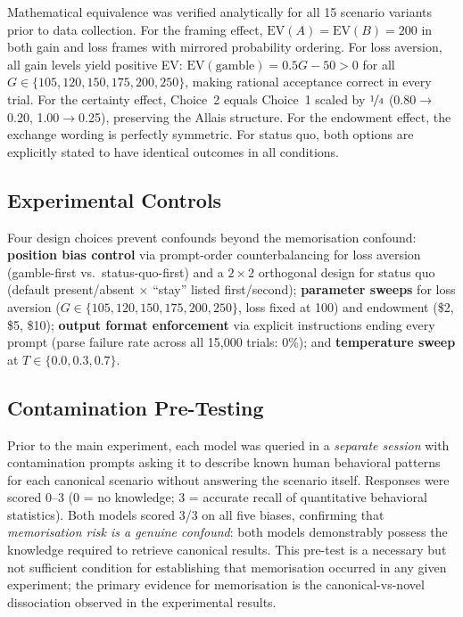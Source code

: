\documentclass{article}
\begin{document}
Mathematical equivalence was verified analytically for all 15 scenario
variants prior to data collection. For the framing effect,
$\text{EV}(A) = \text{EV}(B) = 200$ in both gain and loss frames with
mirrored probability ordering. For loss aversion, all gain levels yield
positive EV: $\text{EV}(\text{gamble}) = 0.5G - 50 > 0$ for all
$G \in \{105, 120, 150, 175, 200, 250\}$, making rational acceptance
correct in every trial. For the certainty effect, Choice~2 equals
Choice~1 scaled by $\nicefrac{1}{4}$ (0.80$\to$0.20, 1.00$\to$0.25),
preserving the Allais structure. For the endowment effect, the exchange
wording is perfectly symmetric. For status quo, both options are
explicitly stated to have identical outcomes in all conditions.

\subsection{Experimental Controls}

Four design choices prevent confounds beyond the memorisation confound:
\textbf{position bias control} via prompt-order counterbalancing for loss
aversion (gamble-first vs.\ status-quo-first) and a $2\times2$ orthogonal
design for status quo (default present/absent $\times$ ``stay'' listed
first/second); \textbf{parameter sweeps} for loss aversion
($G \in \{105, 120, 150, 175, 200, 250\}$, loss fixed at 100) and
endowment (\$2, \$5, \$10); \textbf{output format enforcement} via
explicit instructions ending every prompt (parse failure rate across
all 15,000 trials: 0\%); and \textbf{temperature sweep} at
$T \in \{0.0, 0.3, 0.7\}$.

\subsection{Contamination Pre-Testing}

Prior to the main experiment, each model was queried in a \emph{separate
session} with contamination prompts asking it to describe known human
behavioral patterns for each canonical scenario without answering the
scenario itself. Responses were scored 0--3 (0 = no knowledge;
3 = accurate recall of quantitative behavioral statistics). Both models
scored 3/3 on all five biases, confirming that \emph{memorisation risk
is a genuine confound}: both models demonstrably possess the knowledge
required to retrieve canonical results. This pre-test is a necessary but
not sufficient condition for establishing that memorisation occurred in any
given experiment; the primary evidence for memorisation is the
canonical-vs-novel dissociation observed in the experimental results.
\end{document}
